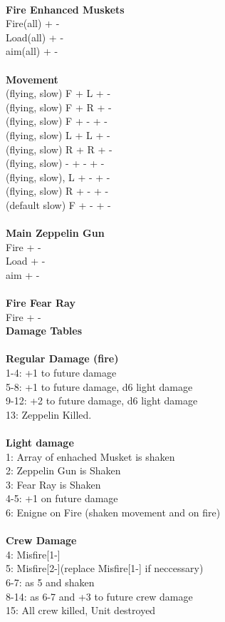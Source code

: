 \ \\ {\bf Fire Enhanced Muskets } \\
Fire(all) + - \\
Load(all) + - \\
aim(all) + - \\
\ \\ {\bf Movement } \\
(flying, slow) F + L + - \\
(flying, slow) F + R + - \\
(flying, slow) F + - + - \\
(flying, slow) L + L + - \\
(flying, slow) R + R + - \\
(flying, slow) - + - + - \\
(flying, slow), L + - + -  \\
(flying, slow) R + - + -  \\
(default slow) F + - + - \\
\ \\ {\bf Main Zeppelin Gun } \\
Fire + - \\
Load + - \\
aim + - \\
\ \\ {\bf Fire Fear Ray } \\
Fire + - \\



{\bf Damage Tables} \\
\ \\ {\bf Regular Damage (fire) } \\
1-4: +1 to future damage \\
5-8: +1 to future damage, d6 light damage \\
9-12: +2 to future damage, d6 light damage \\
13: Zeppelin Killed. \\
\ \\ {\bf Light damage } \\
1: Array of enhached Musket is shaken \\
2: Zeppelin Gun is Shaken \\
3: Fear Ray is Shaken \\
4-5: +1 on future damage \\
6: Enigne on Fire (shaken movement and on fire) \\
\ \\ {\bf Crew Damage } \\
4: Misfire[1-] \\
5: Misfire[2-](replace Misfire[1-] if neccessary) \\
6-7: as 5 and shaken \\
8-14: as 6-7 and +3 to future crew damage \\
15: All crew killed, Unit destroyed \\



